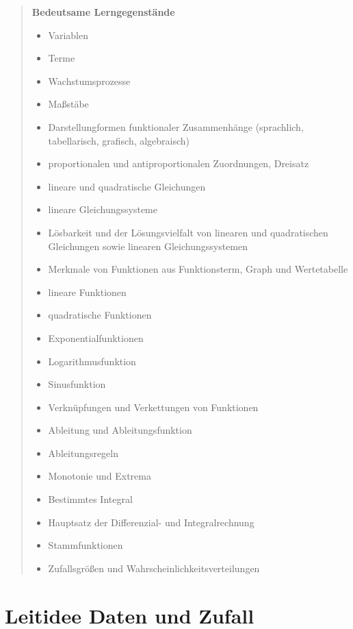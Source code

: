 \documentclass[
]{scrbook}
\providecommand{\tightlist}{%
  \setlength{\itemsep}{0pt}\setlength{\parskip}{0pt}}
\theoremstyle{definition}
\theoremstyle{definition}
\theoremstyle{definition}
\theoremstyle{definition}
\theoremstyle{remark}
\begin{document}
\begin{quote}
\textbf{Bedeutsame Lerngegenstände}

\begin{itemize}
\tightlist
\item
  Variablen
\item
  Terme
\item
  Wachstumsprozesse
\item
  Maßstäbe
\item
  Darstellungformen funktionaler Zusammenhänge (sprachlich, tabellarisch, grafisch, algebraisch)
\item
  proportionalen und antiproportionalen Zuordnungen, Dreisatz
\item
  lineare und quadratische Gleichungen
\item
  lineare Gleichungssysteme
\item
  Lösbarkeit und der Lösungsvielfalt von linearen und quadratischen Gleichungen sowie linearen Gleichungssystemen
\item
  Merkmale von Funktionen aus Funktionsterm, Graph und Wertetabelle
\item
  lineare Funktionen
\item
  quadratische Funktionen
\item
  Exponentialfunktionen
\item
  Logarithmusfunktion
\item
  Sinusfunktion
\item
  Verknüpfungen und Verkettungen von Funktionen
\item
  Ableitung und Ableitungsfunktion
\item
  Ableitungsregeln
\item
  Monotonie und Extrema
\item
  Bestimmtes Integral
\item
  Hauptsatz der Differenzial- und Integralrechnung
\item
  Stammfunktionen
\item
  Zufallsgrößen und Wahrscheinlichkeitsverteilungen
\end{itemize}
\end{quote}

\hypertarget{leitidee-daten-und-zufall}{%
\chapter{Leitidee Daten und Zufall}\label{leitidee-daten-und-zufall}}
\end{document}
